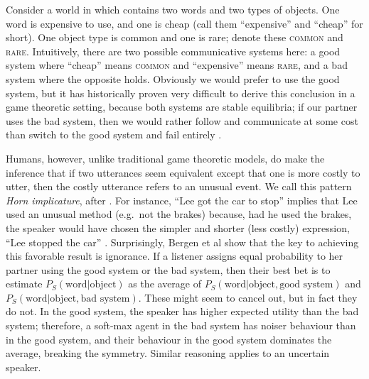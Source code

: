 \documentclass{article} %
\newcommand{\word}{\text{word}}
\newcommand{\obj}{\text{object}}
\begin{document}
Consider a world in which contains two words and two types of objects. One word is expensive to use, and one is cheap (call them ``expensive'' and ``cheap'' for short). One object type is common and one is rare; denote these \textsc{common} and \textsc{rare}. Intuitively, there are two possible communicative systems here: a good system where ``cheap'' means \textsc{common} and ``expensive'' means \textsc{rare}, and a bad system where the opposite holds. Obviously we would prefer to use the good system, but it has historically proven very difficult to derive this conclusion in a game theoretic setting, because both systems are stable equilibria; if our partner uses the bad system, then we would rather follow and communicate at some cost than switch to the good system and fail entirely \cite{bergen2012}.

Humans, however, unlike traditional game theoretic models, do make the inference that if two utterances seem equivalent except that one is more costly to utter, then the costly utterance refers to an unusual event. We call this pattern \textit{Horn implicature}, after \cite{horn1984}. For instance, ``Lee got the car to stop'' implies that Lee used an unusual method (e.g.~not the brakes) because, had he used the brakes, the speaker would have chosen the simpler and shorter (less costly) expression, ``Lee stopped the car'' \cite{horn1984}. Surprisingly, Bergen et al \cite{bergen2012} show that the key to achieving this favorable result is ignorance. If a listener assigns equal probability to her partner using the good system or the bad system, then their best bet is to estimate $P_S(\word | \obj)$ as the average of $P_S(\word | \obj, \text{good system})$ and $P_S(\word | \obj, \text{bad system})$. These might seem to cancel out, but in fact they do not. In the good system, the speaker has higher expected utility than the bad system; therefore, a soft-max agent in the bad system has noiser behaviour than in the good system, and their behaviour in the good system dominates the average, breaking the symmetry. Similar reasoning applies to an uncertain speaker.


%
%
\end{document}
